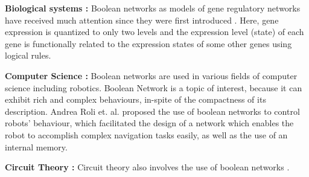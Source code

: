 \documentclass[11pt]{report}
\begin{document}
    \textbf{Biological systems : } Boolean networks as models of gene regulatory networks have received much attention since they were first introduced \cite{Shmulevich2002}.
    Here, gene expression is quantized to only two levels and the expression level (state) of each gene is functionally related to the expression states of some other genes using logical rules.
    
    \textbf{Computer Science : } Boolean networks are used in various fields of computer science including robotics.
    Boolean Network is a topic of interest, because it can exhibit rich and complex behaviours, in-spite of the compactness of its description.
    Andrea Roli et. al. \cite{Roli2011} proposed the use of boolean networks to control robots' behaviour, which facilitated the design of a network which enables the robot to accomplish complex navigation tasks easily, as well as the use of an internal memory.
    
    \textbf{Circuit Theory : } Circuit theory also involves the use of boolean networks \cite{Goles2010}.
    
\end{document}
